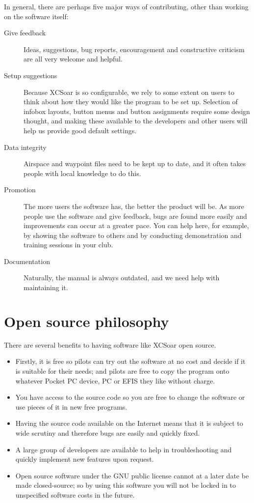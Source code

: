 In general, there are perhaps five major ways of contributing, other
than working on the software itself:
\begin{description}
\item[Give feedback]
Ideas, suggestions, bug reports, encouragement and
constructive criticism are all very welcome and helpful.
\item[Setup suggestions]
Because XCSoar is so configurable, we rely to some extent on users to
think about how they would like the program to be set up.  Selection
of infobox layouts, button menus and button assignments require some
design thought, and making these available to the developers and other
users will help us provide good default settings.
\item[Data integrity]
Airspace and waypoint files need to be kept up to date, and it often
takes people with local knowledge to do this.
\item[Promotion]  The more users the software has, the better
 the product will be.  As more people use the software and give
 feedback, bugs are found more easily and improvements can occur at a
 greater pace.  You can help here, for example, by showing the
 software to others and by conducting demonstration and training
 sessions in your club.
\item[Documentation]  Naturally, the manual is always outdated, and we
  need help with maintaining it.
\end{description}

\section{Open source philosophy}

There are several benefits to having software like XCSoar open source.

\begin{itemize}
\item Firstly, it is free so pilots can try out the software at no
 cost and decide if it is suitable for their needs; and pilots are free
 to copy the program onto whatever Pocket PC device, PC or EFIS they like
 without charge.
\item You have access to the source code so you are free to change
 the software or use pieces of it in new free programs.
\item Having the source code available on the Internet means that it is
 subject to wide scrutiny and therefore bugs are easily and quickly fixed.
\item A large group of developers are available to help in troubleshooting
 and quickly implement new features upon request.
\item Open source software under the GNU public license cannot at a later
 date be made closed-source; so by using this software you will not be
 locked in to unspecified software costs in the future.
\end{itemize}

